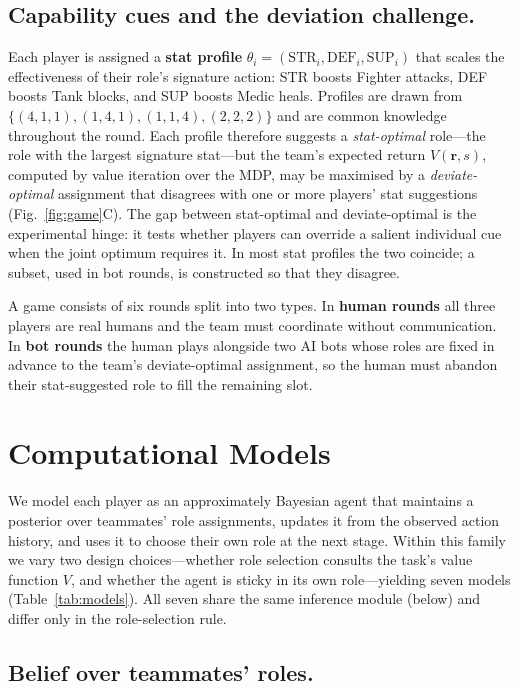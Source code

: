 \documentclass[9pt,twocolumn,twoside]{pnas-new}
\begin{document}
\subsection*{Capability cues and the deviation challenge.}\label{sec:task:profiles}
Each player is assigned a \textbf{stat profile}
$\theta_i = (\mathrm{STR}_i,\mathrm{DEF}_i,\mathrm{SUP}_i)$ that
scales the effectiveness of their role's signature action: STR
boosts Fighter attacks, DEF boosts Tank blocks, and SUP boosts Medic
heals. Profiles are drawn from
$\{(4,1,1),(1,4,1),(1,1,4),(2,2,2)\}$ and are common knowledge
throughout the round. Each profile therefore suggests a
\emph{stat-optimal} role---the role with the largest signature
stat---but the team's expected return $V(\mathbf{r}, s)$, computed
by value iteration over the MDP, may be maximised by a
\emph{deviate-optimal} assignment that disagrees with one or more
players' stat suggestions (Fig.~\ref{fig:game}C). The gap between
stat-optimal and deviate-optimal is the experimental hinge: it tests
whether players can override a salient individual cue when the joint
optimum requires it. In most stat profiles the two coincide; a
subset, used in bot rounds, is constructed so that they disagree.

A game consists of six rounds split into two types. In \textbf{human
rounds} all three players are real humans and the team must
coordinate without communication. In \textbf{bot rounds} the human
plays alongside two AI bots whose roles are fixed in advance to the
team's deviate-optimal assignment, so the human must abandon their
stat-suggested role to fill the remaining slot.

\section*{Computational Models}\label{sec:models}

We model each player as an approximately Bayesian agent that maintains
a posterior over teammates' role assignments, updates it from the
observed action history, and uses it to choose their own role at the
next stage. Within this family we vary two design choices---whether
role selection consults the task's value function $V$, and whether the
agent is sticky in its own role---yielding seven models
(Table~\ref{tab:models}). All seven share the same inference module
(below) and differ only in the role-selection rule.

\subsection*{Belief over teammates' roles.}\label{sec:models:inference}
\end{document}
